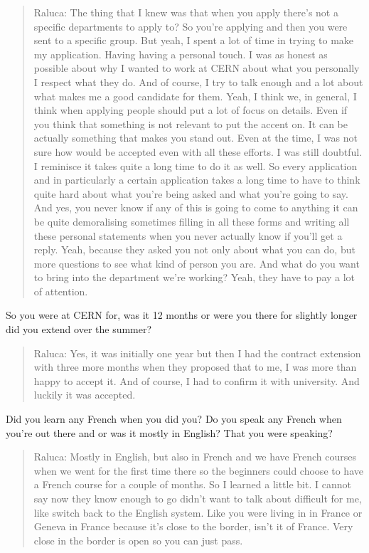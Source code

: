\documentclass[
]{book}
\begin{document}
\begin{quote}
Raluca: The thing that I knew was that when you apply there's not a specific departments to apply to? So you're applying and then you were sent to a specific group. But yeah, I spent a lot of time in trying to make my application. Having having a personal touch. I was as honest as possible about why I wanted to work at CERN about what you personally I respect what they do. And of course, I try to talk enough and a lot about what makes me a good candidate for them. Yeah, I think we, in general, I think when applying people should put a lot of focus on details. Even if you think that something is not relevant to put the accent on. It can be actually something that makes you stand out. Even at the time, I was not sure how would be accepted even with all these efforts. I was still doubtful. I reminisce it takes quite a long time to do it as well. So every application and in particularly a certain application takes a long time to have to think quite hard about what you're being asked and what you're going to say. And yes, you never know if any of this is going to come to anything it can be quite demoralising sometimes filling in all these forms and writing all these personal statements when you never actually know if you'll get a reply. Yeah, because they asked you not only about what you can do, but more questions to see what kind of person you are. And what do you want to bring into the department we're working? Yeah, they have to pay a lot of attention.
\end{quote}

So you were at CERN for, was it 12 months or were you there for slightly longer did you extend over the summer?

\begin{quote}
Raluca: Yes, it was initially one year but then I had the contract extension with three more months when they proposed that to me, I was more than happy to accept it. And of course, I had to confirm it with university. And luckily it was accepted.
\end{quote}

Did you learn any French when you did you? Do you speak any French when you're out there and or was it mostly in English? That you were speaking?

\begin{quote}
Raluca: Mostly in English, but also in French and we have French courses when we went for the first time there so the beginners could choose to have a French course for a couple of months. So I learned a little bit. I cannot say now they know enough to go didn't want to talk about difficult for me, like switch back to the English system. Like you were living in in France or Geneva in France because it's close to the border, isn't it of France. Very close in the border is open so you can just pass.
\end{quote}
\end{document}

